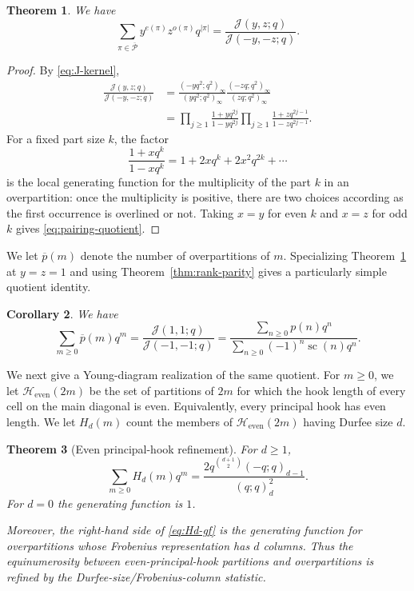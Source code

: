 \documentclass[11pt]{article}
\newtheorem{theorem}{Theorem}[section]
\newtheorem{corollary}[theorem]{Corollary}
\theoremstyle{definition}
\theoremstyle{remark}
\begin{document}
\begin{theorem}\label{thm:pairing-quotient}
We have
\begin{equation}\label{eq:pairing-quotient}
 \sum_{\pi\in\overline{\mathcal P}}
 y^{e(\pi)}z^{o(\pi)}q^{|\pi|}
 =\frac{\mathcal J(y,z;q)}{\mathcal J(-y,-z;q)}.
\end{equation}
\end{theorem}

\begin{proof}
By \eqref{eq:J-kernel},
\begin{align*}
 \frac{\mathcal J(y,z;q)}{\mathcal J(-y,-z;q)}
 &=\frac{(-yq^2;q^2)_\infty}{(yq^2;q^2)_\infty}
   \frac{(-zq;q^2)_\infty}{(zq;q^2)_\infty}\\
 &=\prod_{j\geq1}\frac{1+yq^{2j}}{1-yq^{2j}}
   \prod_{j\geq1}\frac{1+zq^{2j-1}}{1-zq^{2j-1}}.
\end{align*}
For a fixed part size $k$, the factor
\[
 \frac{1+xq^k}{1-xq^k}
 =1+2xq^k+2x^2q^{2k}+\cdots
\]
is the local generating function for the multiplicity of the part $k$ in an overpartition: once the multiplicity is positive, there are two choices according as the first occurrence is overlined or not.  Taking $x=y$ for even $k$ and $x=z$ for odd $k$ gives \eqref{eq:pairing-quotient}.
\end{proof}

We let $\overline p(m)$ denote the number of overpartitions of $m$.  Specializing Theorem~\ref{thm:pairing-quotient} at $y=z=1$ and using Theorem~\ref{thm:rank-parity} gives a particularly simple quotient identity.

\begin{corollary}\label{cor:overpartition-pairing-quotient}
We have
\begin{equation}\label{eq:overpartition-pairing-quotient}
 \sum_{m\geq0}\overline p(m)q^m
 =\frac{\mathcal J(1,1;q)}{\mathcal J(-1,-1;q)}
 =\frac{\displaystyle\sum_{n\geq0}p(n)q^n}
        {\displaystyle\sum_{n\geq0}(-1)^n\operatorname{sc}(n)q^n}.
\end{equation}
\end{corollary}

We next give a Young-diagram realization of the same quotient.  For $m\geq0$, we let $\mathcal H_{\mathrm{even}}(2m)$ be the set of partitions of $2m$ for which the hook length of every cell on the main diagonal is even.  Equivalently, every principal hook has even length.  We let $H_d(m)$ count the members of $\mathcal H_{\mathrm{even}}(2m)$ having Durfee size $d$.

\begin{theorem}[Even principal-hook refinement]\label{thm:even-principal-hooks}
For $d\geq1$,
\begin{equation}\label{eq:Hd-gf}
 \sum_{m\geq0}H_d(m)q^m
 =\frac{2q^{\binom{d+1}{2}}(-q;q)_{d-1}}{(q;q)_d^2}.
\end{equation}
For $d=0$ the generating function is $1$.

Moreover, the right-hand side of \eqref{eq:Hd-gf} is the generating function for overpartitions whose Frobenius representation has $d$ columns.  Thus the equinumerosity between even-principal-hook partitions and overpartitions is refined by the Durfee-size/Frobenius-column statistic.
\end{theorem}
\end{document}
